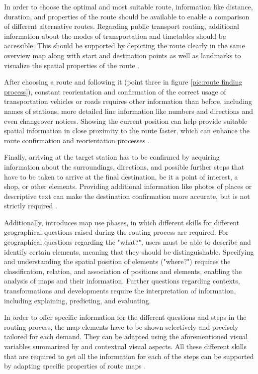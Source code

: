 \documentclass[agile, final]{copernicus-agile}
\begin{document}
In order to choose the optimal and most suitable route, information like distance, duration, and properties of the route should be available to enable a comparison of different alternative routes. Regarding public transport routing, additional information about the modes of transportation and timetables should be accessible. This should be supported by depicting the route clearly in the same overview map along with start and destination points as well as landmarks to visualize the spatial properties of the route \citep{Delikostidis2011}.

After choosing a route and following it (point three in figure \ref{pic:route finding process}), constant reorientation and confirmation of the correct usage of transportation vehicles or roads requires other information than before, including names of stations, more detailed line information like numbers and directions and even changeover notices. Showing the current position can help provide suitable spatial information in close proximity to the route faster, which can enhance the route confirmation and reorientation processes \citep{Delikostidis2011}.

Finally, arriving at the target station has to be confirmed by acquiring information about the surroundings, directions, and possible further steps that have to be taken to arrive at the final destination, be it a point of interest, a shop, or other elements. Providing additional information like photos of places or descriptive text can make the destination confirmation more accurate, but is not strictly required \citep{Delikostidis2011}.

Additionally, \citet{Ormeling1996} introduces map use phases, in which different skills for different geographical questions raised during the routing process are required. For geographical questions regarding the "what?", users must be able to describe and identify certain elements, meaning that they should be distinguishable. Specifying and understanding the spatial position of elements ("where?") requires the classification, relation, and association of positions and elements, enabling the analysis of maps and their information. Further questions regarding contexts, transformations and developments require the interpretation of information, including explaining, predicting, and evaluating.

In order to offer specific information for the different questions and steps in the routing process, the map elements have to be shown selectively and precisely tailored for each demand. They can be adapted using the aforementioned visual variables summarized by \citet{Roth2017} and contextual visual aspects. All these different skills that are required to get all the information for each of the steps can be supported by adapting specific properties of route maps \citep{Delikostidis2011, AgrawalaStolte2000}. 
\end{document}

